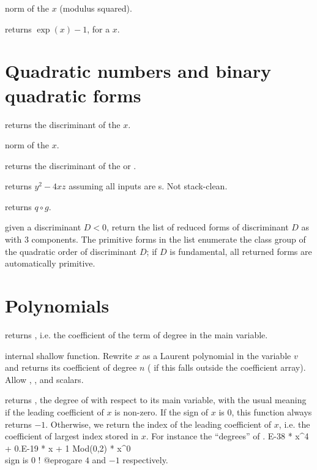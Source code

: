  norm of the  $x$ (modulus squared).

 returns $\exp(x)-1$, for a  $x$.

\section{Quadratic numbers and binary quadratic forms}

 returns the discriminant of the  $x$.

 norm of the  $x$.

 returns the discriminant of the 
or  .

 returns $y^2 - 4xz$ assuming all
inputs are s. Not stack-clean.

 returns $q \circ g$.

 given a discriminant $D < 0$, return the list
of reduced forms of discriminant $D$ as  with 3 components.
The primitive forms in the list enumerate the class group of the quadratic
order of discriminant $D$; if $D$ is fundamental, all returned forms
are automatically primitive.

\section{Polynomials}\label{se:polynomials}

 returns , i.e.
the coefficient of the term of degree  in the main variable.

 internal shallow function. Rewrite
$x$ as a Laurent polynomial in the variable $v$ and returns its coefficient
of degree $n$ ( if this falls outside the coefficient array).
Allow , ,  and scalars.

 returns , the degree of
 with respect to its main variable, with the usual meaning if the
leading coefficient of $x$ is non-zero. If the sign of $x$ is $0$, this
function always returns $-1$. Otherwise, we return the index of the leading
coefficient of $x$, i.e. the coefficient of largest index stored in $x$.
For instance the ``degrees'' of
. E-38 * x^4 + 0.E-19 * x + 1
  Mod(0,2) * x^0    \\ sign is 0 !
@eprog\noindent are $4$ and $-1$ respectively.

